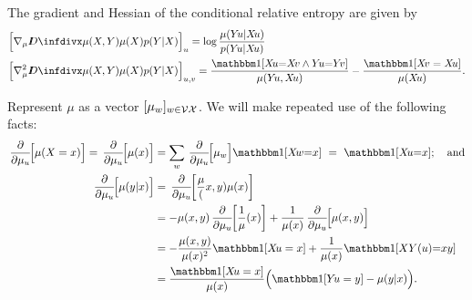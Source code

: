 \begin{lemma}\label{lem:hess-relent}
    The gradient and Hessian of the conditional relative entropy
    are given by
    \begin{align*}
        \Big[ \nabla_{\mu} \kldiv{\mu(X,Y)}{\mu(X) p(Y|X) } &\Big]_u
            = \log \frac{\mu(Y\! u | X\! u)}{  p(Y\! u | X\! u)} \\
        \Big[ \nabla^2_\mu \kldiv{\mu(X,Y)}{\mu(X)p(Y|X)}&\Big]_{u,v}
            = \frac{\mathbbm1[X\!u {=} X\!v \land Y\!u {=} Y\!v]}{\mu(Y\! u, X\! u)}
            - \frac{\mathbbm1[X\!v = X\!u]}{\mu(X\!u)}
        .
    \end{align*}
\end{lemma}
\begin{lproof} 
    \allowdisplaybreaks

    \def\pd/d#1[#2]{\,\frac{\partial}{\partial #1}\!\! \left[\vphantom{\Big|}#2\right]}
   
    Represent $\mu$ as a vector $[\mu_{w}]_{w \in \mathcal V\mathcal X}$.
    We will make repeated use of the following facts:
    \begin{align*}
        \pd/d\mu_u [\mu(X{=}x)]=
        \pd/d\mu_u [\mu(x)]
         &= \sum_w \pd/d\mu_u[\mu_w] \! \mathbbm1[X\!w{=}x]
            ~=~  \mathbbm1[ X\! u {=} x] ; \quad\text{and}\\
        \pd/d\mu_u [\mu(y|x)] &=  
            \pd/d\mu_u [ \frac{\mu(x,y)}{\mu(x)}] \\
        &= - \mu(x,y) \pd/d\mu_u[ \frac{1}{\mu(x)} ]
            + \frac1{\mu(x)} \pd/d\mu_u[ \mu(x,y) ] \\
        &= - \frac{\mu(x,y)}{\mu(x)^2} 
            \mathbbm1[ X\!u = x] + \frac{1}{\mu(x)} \mathbbm1[XY(u){=}xy] \\
        &= \frac{\mathbbm1[X\!u = x]}{\mu(x)}\Big( \mathbbm1[Y\!u=y] - \mu(y|x) \Big).
    \end{align*}
    

\end{lproof}
